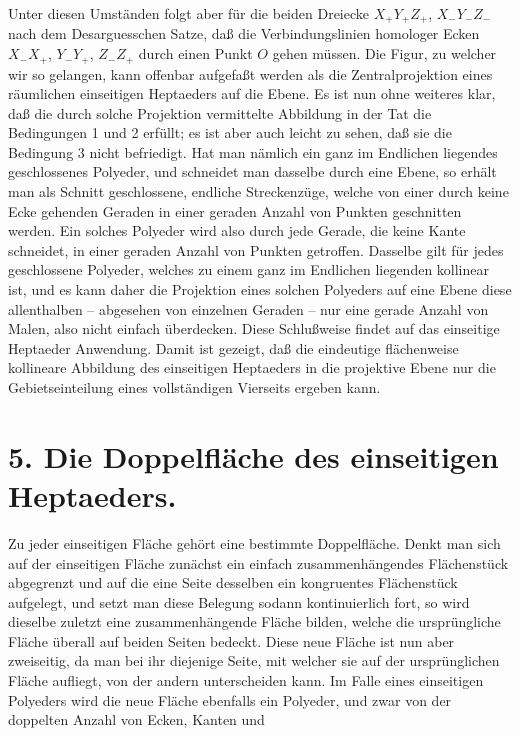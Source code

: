 \documentclass[11pt,a4paper]{article}
\begin{document}
Unter diesen Umst\"anden folgt aber f\"ur die beiden Dreiecke $X_+Y_+Z_+$, $X_-Y_-Z_-$ nach dem Desarguesschen Satze, da\ss{} die Verbindungslinien homologer Ecken $X_-X_+$, $Y_-Y_+$, $Z_-Z_+$ durch einen Punkt $O$ gehen m\"ussen. Die Figur, zu welcher wir so gelangen, kann offenbar aufgefa\ss{}t werden als die Zentralprojektion eines r\"aumlichen einseitigen Heptaeders auf die Ebene. Es ist nun ohne weiteres klar, da\ss{} die durch solche Projektion vermittelte Abbildung in der Tat die Bedingungen 1 und 2 erf\"ullt; es ist aber auch leicht zu sehen, da\ss{} sie die Bedingung 3 nicht befriedigt. Hat man n\"amlich ein ganz im Endlichen liegendes geschlossenes Polyeder, und schneidet man dasselbe durch eine Ebene, so erh\"alt man als Schnitt geschlossene, endliche Streckenz\"uge, welche von einer durch keine Ecke gehenden Geraden in einer geraden Anzahl von Punkten geschnitten werden. Ein solches Polyeder wird also durch jede Gerade, die keine Kante schneidet, in einer geraden Anzahl von Punkten getroffen. Dasselbe gilt f\"ur jedes geschlossene Polyeder, welches zu einem ganz im Endlichen liegenden kollinear ist, und es kann daher die Projektion eines solchen Polyeders auf eine Ebene diese allenthalben -- abgesehen von einzelnen Geraden -- nur eine gerade Anzahl von Malen, also nicht einfach \"uberdecken. Diese Schlu\ss{}weise findet auf das einseitige Heptaeder Anwendung. Damit ist gezeigt, da\ss{} die eindeutige fl\"achenweise kollineare Abbildung des einseitigen Heptaeders in die projektive Ebene nur die Gebietseinteilung eines vollst\"andigen Vierseits ergeben kann.

\section*{5. Die Doppelfl\"ache des einseitigen Heptaeders.}

Zu jeder einseitigen Fl\"ache geh\"ort eine bestimmte Doppelfl\"ache. Denkt man sich auf der einseitigen Fl\"ache zun\"achst ein einfach zusammenh\"angendes Fl\"achenst\"uck abgegrenzt und auf die eine Seite desselben ein kongruentes Fl\"achenst\"uck aufgelegt, und setzt man diese Belegung sodann kontinuierlich fort, so wird dieselbe zuletzt eine zusammenh\"angende Fl\"ache bilden, welche die urspr\"ungliche Fl\"ache \"uberall auf beiden Seiten bedeckt. Diese neue Fl\"ache ist nun aber zweiseitig, da man bei ihr diejenige Seite, mit welcher sie auf der urspr\"unglichen Fl\"ache aufliegt, von der andern unterscheiden kann. Im Falle eines einseitigen Polyeders wird die neue Fl\"ache ebenfalls ein Polyeder, und zwar von der doppelten Anzahl von Ecken, Kanten und
\end{document}
